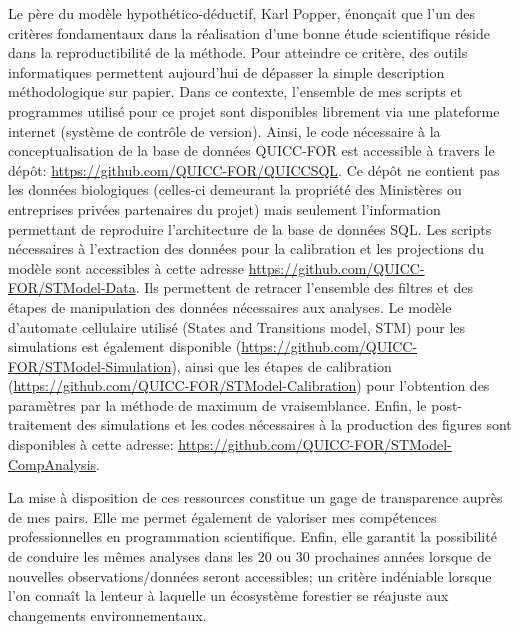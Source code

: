 Le père du modèle hypothético-déductif, Karl Popper, énonçait que l'un des critères fondamentaux
dans la réalisation d'une bonne étude scientifique réside dans la reproductibilité de la méthode.
Pour atteindre ce critère, des outils informatiques permettent aujourd'hui de dépasser la simple
description méthodologique sur papier. Dans ce contexte, l'ensemble de mes scripts et programmes
utilisé pour ce projet sont disponibles librement via une plateforme internet
(système de contrôle de version). Ainsi, le code nécessaire à la conceptualisation de la base de
données QUICC-FOR est accessible à travers le dépôt: \url{https://github.com/QUICC-FOR/QUICCSQL}. Ce
dépôt ne contient pas les données biologiques (celles-ci demeurant la propriété des Ministères ou
entreprises privées partenaires du projet) mais seulement l'information permettant de reproduire
l'architecture de la base de données SQL. Les scripts nécessaires à l'extraction des données pour la
calibration et les projections du modèle sont accessibles à cette adresse
\url{https://github.com/QUICC-FOR/STModel-Data}. Ils permettent de retracer l'ensemble des filtres
et des étapes de manipulation des données nécessaires aux analyses. Le modèle
d'automate cellulaire utilisé (States and Transitions model, STM) pour les simulations est également
disponible (\url{https://github.com/QUICC-FOR/STModel-Simulation}), ainsi que les étapes de
calibration (\url{https://github.com/QUICC-FOR/STModel-Calibration}) pour l'obtention des paramètres
par la méthode de maximum de vraisemblance. Enfin, le post-traitement des simulations et les codes
nécessaires à la production des figures sont disponibles à cette adresse:
\url{https://github.com/QUICC-FOR/STModel-CompAnalysis}.

La mise à disposition de ces ressources constitue un gage de transparence auprès de mes pairs. Elle
me permet également de valoriser mes compétences professionnelles en programmation scientifique.
Enfin, elle garantit la possibilité de conduire les mêmes analyses dans les 20 ou 30 prochaines
années lorsque de nouvelles observations/données seront accessibles; un critère indéniable lorsque
l'on connaît la lenteur à laquelle un écosystème forestier se réajuste aux changements
environnementaux.



